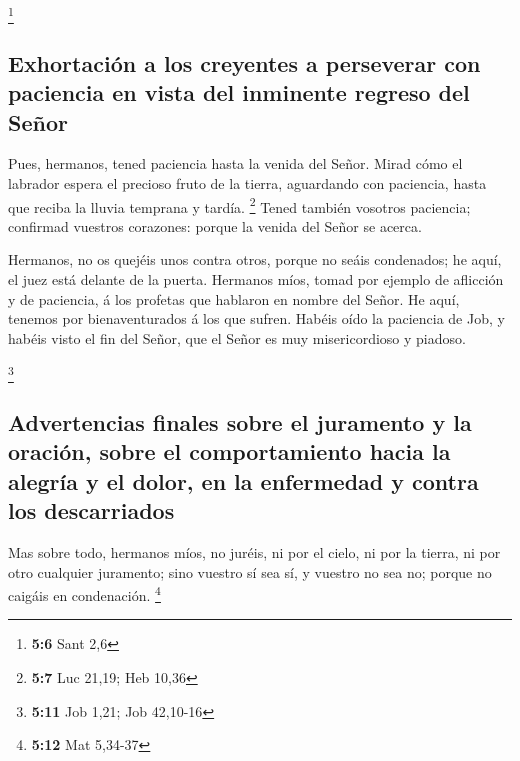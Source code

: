 \footnote{\textbf{5:6} Sant 2,6}

\hypertarget{exhortaciuxf3n-a-los-creyentes-a-perseverar-con-paciencia-en-vista-del-inminente-regreso-del-seuxf1or}{%
\subsection{Exhortación a los creyentes a perseverar con paciencia en
vista del inminente regreso del
Señor}\label{exhortaciuxf3n-a-los-creyentes-a-perseverar-con-paciencia-en-vista-del-inminente-regreso-del-seuxf1or}}

 Pues, hermanos, tened paciencia hasta la venida del
Señor. Mirad cómo el labrador espera el precioso fruto de la tierra,
aguardando con paciencia, hasta que reciba la lluvia temprana y tardía.
\footnote{\textbf{5:7} Luc 21,19; Heb 10,36}  Tened
también vosotros paciencia; confirmad vuestros corazones: porque la
venida del Señor se acerca.

 Hermanos, no os quejéis unos contra otros, porque no
seáis condenados; he aquí, el juez está delante de la puerta.
 Hermanos míos, tomad por ejemplo de aflicción y de
paciencia, á los profetas que hablaron en nombre del Señor.
 He aquí, tenemos por bienaventurados á los que sufren.
Habéis oído la paciencia de Job, y habéis visto el fin del Señor, que el
Señor es muy misericordioso y piadoso.

\footnote{\textbf{5:11} Job 1,21; Job 42,10-16}

\hypertarget{advertencias-finales-sobre-el-juramento-y-la-oraciuxf3n-sobre-el-comportamiento-hacia-la-alegruxeda-y-el-dolor-en-la-enfermedad-y-contra-los-descarriados}{%
\subsection{Advertencias finales sobre el juramento y la oración, sobre
el comportamiento hacia la alegría y el dolor, en la enfermedad y contra
los
descarriados}\label{advertencias-finales-sobre-el-juramento-y-la-oraciuxf3n-sobre-el-comportamiento-hacia-la-alegruxeda-y-el-dolor-en-la-enfermedad-y-contra-los-descarriados}}

 Mas sobre todo, hermanos míos, no juréis, ni por el
cielo, ni por la tierra, ni por otro cualquier juramento; sino vuestro
sí sea sí, y vuestro no sea no; porque no caigáis en condenación.
\footnote{\textbf{5:12} Mat 5,34-37}

